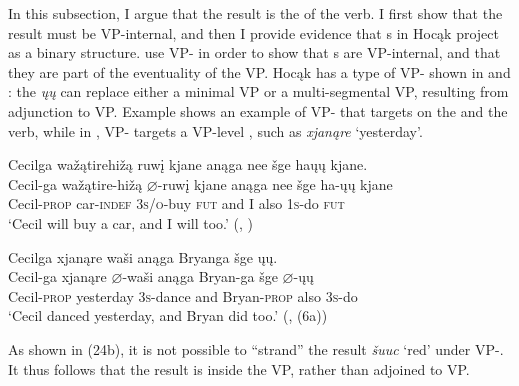 \documentclass[output=paper]{LSP/langsci}
\begin{document}
In this subsection, I argue that the result  is the  of the verb. I first show that the result  must be VP-internal, and then I provide evidence that s in Hocąk project as a binary structure. \citet{LevinRappaportHovav1995} use VP- in order to show that s are VP-internal, and that they are part of the eventuality of the VP. Hocąk has a type of VP- shown in  and : the  \textit{ųų} can replace either a minimal VP or a multi-segmental VP, resulting from adjunction to VP. Example  shows an example of VP- that targets on the  and the verb, while in , VP- targets a VP-level , such as \textit{xjanąre} `yesterday'.

\begin{exe}
\ex \label{ex:rosen:22}
\glll Cecilga {\ob}{\sVP} wažątirehižą ruwį{\cb} kjane anąga nee šge {\ob}haųų{\cb} kjane.\\
Cecil-ga {} wažątire-hižą {$\varnothing$}-ruwį kjane anąga nee šge ha-ųų kjane\\
Cecil-\textsc{prop} {} car-\textsc{indef} \textsc{3s/o}-buy \textsc{fut} and I also \textsc{1s}-do \textsc{fut}\\
\glt `Cecil will buy a car, and I will too.' (\citealt{Johnson2013}, )

\ex \label{ex:rosen:23}
\glll Cecilga {\ob}{\sVP} xjanąre waši{\cb} anąga Bryanga šge {\ob}ųų{\cb}.\\
Cecil-ga {} xjanąre {$\varnothing$}-waši anąga Bryan-ga šge {$\varnothing$}-ųų\\
Cecil-\textsc{prop} {} yesterday \textsc{3s}-dance and Bryan-\textsc{prop} also \textsc{3s}-do\\
\glt `Cecil danced yesterday, and Bryan did too.' (\citealt{Johnson2013}, (6a))

\end{exe}

As shown in (24b), it is not possible to ``strand'' the result  \textit{šuuc} `red' under VP-. It thus follows that the result is inside the VP, rather than adjoined to VP.
\end{document}
